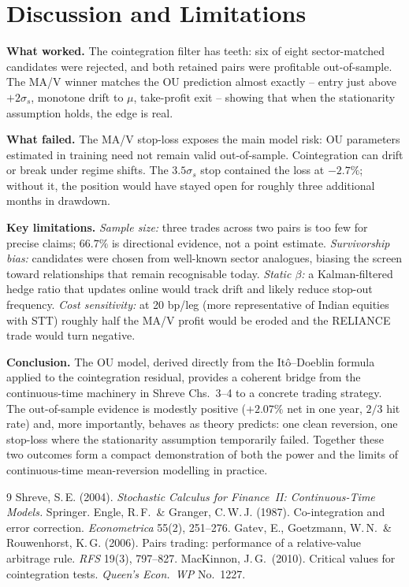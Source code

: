\documentclass[11pt,a4paper]{article}
\begin{document}
\section{Discussion and Limitations}

\textbf{What worked.} The cointegration filter has teeth: six of eight
sector-matched candidates were rejected, and both retained pairs were
profitable out-of-sample. The MA/V winner matches the OU prediction almost
exactly -- entry just above $+2\sigma_s$, monotone drift to $\mu$, take-profit
exit -- showing that when the stationarity assumption holds, the edge is real.

\textbf{What failed.} The MA/V stop-loss exposes the main model risk: OU
parameters estimated in training need not remain valid out-of-sample.
Cointegration can drift or break under regime shifts. The $3.5\sigma_s$ stop
contained the loss at $-2.7\%$; without it, the position would have stayed
open for roughly three additional months in drawdown.

\textbf{Key limitations.} \emph{Sample size:} three trades across two pairs
is too few for precise claims; $66.7\%$ is directional evidence, not a
point estimate. \emph{Survivorship bias:} candidates were chosen from
well-known sector analogues, biasing the screen toward relationships that
remain recognisable today. \emph{Static $\beta$:} a Kalman-filtered hedge
ratio that updates online would track drift and likely reduce stop-out
frequency. \emph{Cost sensitivity:} at 20 bp/leg (more representative of
Indian equities with STT) roughly half the MA/V profit would be eroded and
the RELIANCE trade would turn negative.

\textbf{Conclusion.} The OU model, derived directly from the
It\^o--Doeblin formula applied to the cointegration residual, provides a
coherent bridge from the continuous-time machinery in Shreve Chs.~3--4 to a
concrete trading strategy. The out-of-sample evidence is modestly positive
($+2.07\%$ net in one year, $2/3$ hit rate) and, more importantly, behaves
as theory predicts: one clean reversion, one stop-loss where the
stationarity assumption temporarily failed. Together these two outcomes
form a compact demonstration of both the power and the limits of
continuous-time mean-reversion modelling in practice.

\vspace{-2pt}
{\footnotesize
\begin{thebibliography}{9}
\setlength{\itemsep}{-1pt}
 Shreve, S.\,E. (2004). \emph{Stochastic Calculus for Finance~II: Continuous-Time Models.} Springer.
 Engle, R.\,F.\ \& Granger, C.\,W.\,J. (1987). Co-integration and error correction. \emph{Econometrica} 55(2), 251--276.
 Gatev, E., Goetzmann, W.\,N.\ \& Rouwenhorst, K.\,G. (2006). Pairs trading: performance of a relative-value arbitrage rule. \emph{RFS} 19(3), 797--827.
 MacKinnon, J.\,G.\ (2010). Critical values for cointegration tests. \emph{Queen's Econ.\ WP} No.~1227.
\end{thebibliography}
}
\end{document}
